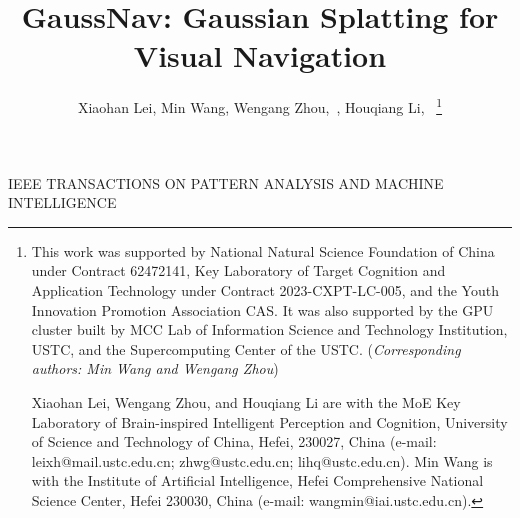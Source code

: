 \documentclass[lettersize,journal]{IEEEtran}
\begin{document}
\title{GaussNav: Gaussian Splatting for Visual Navigation}

\author{Xiaohan Lei, Min Wang, Wengang Zhou,~, Houqiang Li,~
\thanks{
This work was supported by National Natural Science Foundation of China
under Contract 62472141, Key Laboratory of Target Cognition and Application Technology under Contract 2023-CXPT-LC-005, and the Youth Innovation Promotion Association CAS. It was also supported by the GPU cluster built by MCC Lab of Information Science and Technology Institution, USTC, and the Supercomputing Center of the USTC. (\textit{Corresponding authors: Min Wang and Wengang Zhou})

Xiaohan Lei, Wengang Zhou, and Houqiang Li are with the MoE Key Laboratory of Brain-inspired Intelligent Perception and Cognition, University of Science and Technology of China, Hefei, 230027, China (e-mail: leixh@mail.ustc.edu.cn; zhwg@ustc.edu.cn; lihq@ustc.edu.cn).
Min Wang is with the Institute of Artificial Intelligence, Hefei Comprehensive National Science Center, Hefei 230030, China (e-mail: wangmin@iai.ustc.edu.cn).}%
}

{IEEE TRANSACTIONS ON PATTERN ANALYSIS AND MACHINE INTELLIGENCE}



\maketitle
\end{document}
